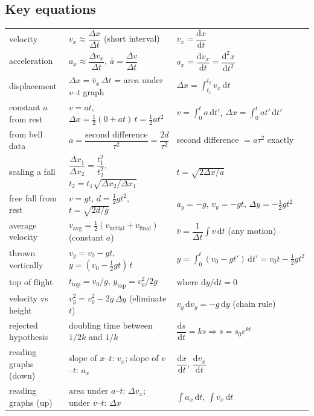 \documentclass[11pt,twoside,openany]{book}
\newcommand{\dd}{\mathrm{d}}
\newcommand{\viewtag}[3]{\fcolorbox{#2}{#3}{\footnotesize\textbf{\textcolor{#2}{#1}}}}
\newcommand{\elemtag}{\viewtag{Elementary}{elemcol}{elempale}}
\newcommand{\calctag}{\viewtag{Calculus}{calccol}{calcpale}}
\begin{document}
\subsection*{Key equations}
\begin{center}
\renewcommand{\arraystretch}{2.4}
\small
\begin{tabular}{lll}
\toprule
 & \elemtag & \calctag \\
\midrule
velocity & $v_x \approx \dfrac{\Delta x}{\Delta t}$ (short interval) & $v_x = \dfrac{\dd x}{\dd t}$ \\
acceleration & $a_x \approx \dfrac{\Delta v_x}{\Delta t}$, \quad $\bar a = \dfrac{\Delta v}{\Delta t}$ & $a_x = \dfrac{\dd v_x}{\dd t} = \dfrac{\dd^2 x}{\dd t^2}$ \\
displacement & $\Delta x = \bar v_x\,\Delta t$ = area under $v$--$t$ graph & $\Delta x = \displaystyle\int_{t_1}^{t_2} v_x\,\dd t$ \\
constant $a$ from rest & $v = at$, \quad $\Delta x = \tfrac12(0 + at)\,t = \tfrac12 a t^2$ & $v = \displaystyle\int_0^t a\,\dd t'$, \quad $\Delta x = \displaystyle\int_0^t at'\,\dd t'$ \\
from bell data & $a = \dfrac{\text{second difference}}{\tau^2} = \dfrac{2d}{\tau^2}$ & second difference $= a\tau^2$ exactly \\
scaling a fall & $\dfrac{\Delta x_1}{\Delta x_2} = \dfrac{t_1^2}{t_2^2}$, \quad $t_2 = t_1\sqrt{\Delta x_2/\Delta x_1}$ & $t = \sqrt{2\Delta x/a}$ \\
free fall from rest & $v = gt$, \quad $d = \tfrac12 g t^2$, \quad $t = \sqrt{2d/g}$ & $a_y = -g$, \; $v_y = -gt$, \; $\Delta y = -\tfrac12 g t^2$ \\
average velocity & $v_{\text{avg}} = \tfrac12(v_{\text{initial}} + v_{\text{final}})$ (constant $a$) & $\bar v = \dfrac{1}{\Delta t}\displaystyle\int v\,\dd t$ (any motion) \\
thrown vertically & $v_y = v_0 - gt$, \quad $y = (v_0 - \tfrac12 gt)\,t$ & $y = \displaystyle\int_0^t (v_0 - gt')\,\dd t' = v_0 t - \tfrac12 g t^2$ \\
top of flight & $t_{\text{top}} = v_0/g$, \quad $y_{\text{top}} = v_0^2/2g$ & where $\dd y/\dd t = 0$ \\
velocity vs height & $v_y^2 = v_0^2 - 2g\,\Delta y$ (eliminate $t$) & $v_y\,\dd v_y = -g\,\dd y$ (chain rule) \\
rejected hypothesis & doubling time between $1/2k$ and $1/k$ & $\dfrac{\dd s}{\dd t} = ks \Rightarrow s = s_0 e^{kt}$ \\
reading graphs (down) & slope of $x$--$t$: $v_x$; \; slope of $v$--$t$: $a_x$ & $\dfrac{\dd x}{\dd t}$, \; $\dfrac{\dd v_x}{\dd t}$ \\
reading graphs (up) & area under $a$--$t$: $\Delta v_x$; \; under $v$--$t$: $\Delta x$ & $\displaystyle\int a_x\,\dd t$, \; $\displaystyle\int v_x\,\dd t$ \\
\bottomrule
\end{tabular}
\end{center}
\end{document}
